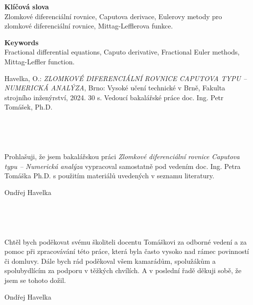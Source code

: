 \documentclass[a4paper,12pt,twoside]{article}
\theoremstyle{definition}
\theoremstyle{remark}
\numberwithin{equation}{section}
\numberwithin{table}{section}
\numberwithin{figure}{section}
\begin{document}
\vspace{1cm}
\noindent
{\bf Klíčová slova}\\
Zlomkové diferenciální rovnice, Caputova derivace, Eulerovy metody pro zlomkové diferenciální rovnice, Mittag-Lefflerova funkce.

\vspace{1cm}
\noindent
{\bf Keywords}\\
Fractional differential equations, Caputo derivative, Fractional Euler methods, Mittag-Leffler function.

\vfill\noindent
Havelka, O.: {\it ZLOMKOVÉ DIFERENCIÁLNÍ ROVNICE CAPUTOVA TYPU -- NUMERICKÁ ANALÝZA}, Brno: Vysoké učení technické v Brně, Fakulta strojního inženýrství, 2024. 30 s. Vedoucí bakalářské práce doc. Ing. Petr Tomášek, Ph.D.

\newpage
\thispagestyle{empty}
\

\newpage
\thispagestyle{empty}

\

\vspace{15cm}\noindent Prohlašuji, že jsem bakalářskou práci {\it
Zlomkové diferenciální rovnice Caputova typu -- Numerická analýza} vypracoval samostatně pod
vedením doc. Ing. Petra Tomáška Ph.D. s použitím materiálů uvedených
v seznamu literatury.

\vspace{1cm}
\hfill{Ondřej Havelka}

\newpage
\thispagestyle{empty}
\

\newpage
\thispagestyle{empty}

\

\vspace{18cm}\noindent Chtěl bych poděkovat svému školiteli docentu Tomáškovi za odborné vedení a za pomoc při zpracovávání této práce, která byla často vysoko nad rámec povinností či domluvy. Dále bych rád poděkoval všem kamarádům, spolužákům a spolubydlícím za podporu v těžkých chvílích. A v poslední řadě děkuji sobě, že jsem se tohoto dožil.

\vspace{1cm}
\hfill{Ondřej Havelka}

\newpage
\thispagestyle{empty}
\
\end{document}

